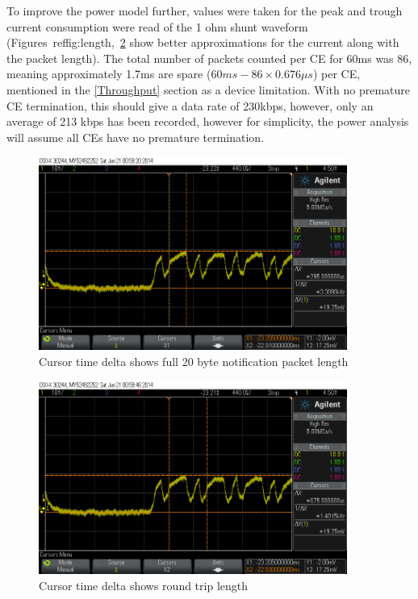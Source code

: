 \documentclass[]{article}
\begin{document}

To improve the power model further, values were taken for the peak and trough current consumption were read of the 1 ohm shunt waveform (Figures~ref{fig:length},~\ref{fig:lengthpkt} show better approximations for the current along with the packet length). The total number of packets counted per \ac{CE} for 60ms was 86, meaning approximately 1.7ms are spare ($60ms - 86 \times 0.676\mu s$) per \ac{CE}, mentioned in the \ref{Throughput} section as a device limitation. With no premature \ac{CE} termination, this should give a data rate of 230kbps, however, only an average of 213 kbps has been recorded, however for simplicity, the power analysis will assume all \ac{CE}s have no premature termination.

\begin{figure}[H]
	\begin{center}
		\includegraphics[width = 0.9\textwidth]{length}
	\end{center}
	\caption{Cursor time delta shows full 20 byte notification packet length}
	\label{fig:length}
\end{figure}

\begin{figure}[H]
	\begin{center}
		\includegraphics[width = 0.9\textwidth]{lengthpkt}
	\end{center}
	\caption{Cursor time delta shows round trip length}
	\label{fig:lengthpkt}
\end{figure}
\end{document}
